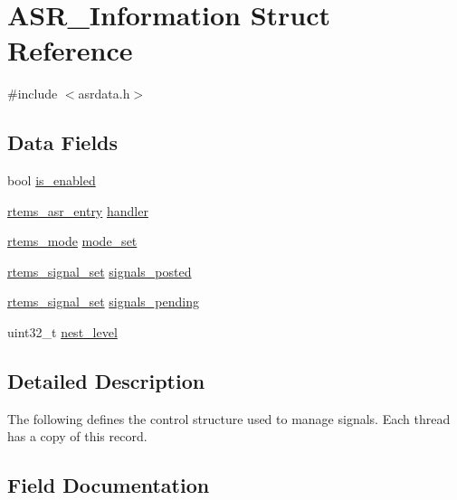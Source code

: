 \hypertarget{structASR__Information}{}\section{A\+S\+R\+\_\+\+Information Struct Reference}
\label{structASR__Information}


{\ttfamily \#include $<$asrdata.\+h$>$}

\subsection*{Data Fields}
\begin{DoxyCompactItemize}
\item 
bool \mbox{\hyperlink{structASR__Information_a7867fe164c596671a03b8fc9815ef30b}{is\+\_\+enabled}}
\item 
\mbox{\hyperlink{group__ClassicASR_ga7277136adc52f70cdfd49c687ce37732}{rtems\+\_\+asr\+\_\+entry}} \mbox{\hyperlink{structASR__Information_a1ff9d82a204e18a92e6f179899512048}{handler}}
\item 
\mbox{\hyperlink{group__ClassicModes_ga8d46a41a837840dc97336fdcd20e4f68}{rtems\+\_\+mode}} \mbox{\hyperlink{structASR__Information_aeb55b502dd8bb7e8496ac16b7c76e3dc}{mode\+\_\+set}}
\item 
\mbox{\hyperlink{group__ClassicASR_gae494c868e6d04d19b2f403bb51de98eb}{rtems\+\_\+signal\+\_\+set}} \mbox{\hyperlink{structASR__Information_a083c9a2c791d173df462686b69816583}{signals\+\_\+posted}}
\item 
\mbox{\hyperlink{group__ClassicASR_gae494c868e6d04d19b2f403bb51de98eb}{rtems\+\_\+signal\+\_\+set}} \mbox{\hyperlink{structASR__Information_aa4b7d935b677bb59e360c58ffcb753a3}{signals\+\_\+pending}}
\item 
uint32\+\_\+t \mbox{\hyperlink{structASR__Information_abe1c4f3de4c17e68b7f0474c8380828d}{nest\+\_\+level}}
\end{DoxyCompactItemize}


\subsection{Detailed Description}
The following defines the control structure used to manage signals. Each thread has a copy of this record. 

\subsection{Field Documentation}
\mbox{\label{structASR__Information_a1ff9d82a204e18a92e6f179899512048}} 
